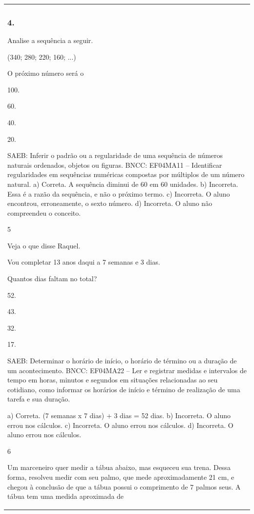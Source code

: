 \begin{mdframed}[linewidth=2pt,linecolor=salmao,roundcorner=2pt]
\begin{escolha}
{{{\begin{longtable}[]{@{}l@{}}
\begin{itemize}
{\subsubsection{4. }

Analise a sequência a seguir.

(340; 280; 220; 160; ...)

 O próximo número será o

\begin{escolha}
\item
  100.
\item
  60.
\item
  40.
\item
  20.
\end{escolha}

SAEB: Inferir o padrão ou a regularidade de uma sequência de
números naturais ordenados, objetos ou figuras.
BNCC: EF04MA11 -- Identificar regularidades em sequências numéricas compostas por múltiplos de um
número natural.
a) Correta. A sequência diminui de 60 em 60 unidades.
b) Incorreta. Essa é a razão da sequência, e não o próximo termo.
c) Incorreta. O aluno encontrou, erroneamente, o sexto número.
d) Incorreta. O aluno não compreendeu o conceito.

\num{5}

Veja o que disse Raquel.

Vou completar 13 anos daqui a 7 semanas e 3 dias.

Quantos dias faltam no total?

\begin{escolha}
\item
  52.
\item
  43.
\item
  32.
\item
  17.
\end{escolha}

SAEB: Determinar o horário de início, o horário de término ou
a duração de um acontecimento.
BNCC: EF04MA22 -- Ler e registrar medidas e intervalos de tempo em horas, minutos e segundos em
situações relacionadas ao seu cotidiano, como informar os horários de início e término de realização
de uma tarefa e sua duração.

a) Correta. (7 semanas x 7 dias) + 3 dias = 52 dias.
b) Incorreta. O aluno errou nos cálculos.
c) Incorreta. O aluno errou nos cálculos.
d) Incorreta. O aluno errou nos cálculos.

\num{6}

Um marceneiro quer medir a tábua abaixo, mas esqueceu sua trena. Dessa
forma, resolveu medir com seu palmo, que mede aproximadamente 21 cm, e
chegou à conclusão de que a tábua possui o comprimento
de 7 palmos seus. A tábua tem uma medida aproximada de

}
\end{itemize}
\end{longtable}}}}
\end{escolha}
\end{mdframed}
